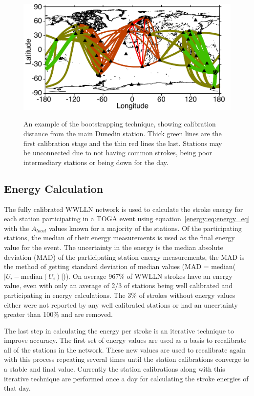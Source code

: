 \begin{figure}[ht!]
\centering
\includegraphics[scale=1]{energy/Figures/PPS_Hop.pdf}\\
\caption{An example of the bootstrapping technique, showing calibration distance from the main Dunedin station. Thick green lines are the first calibration stage and the thin red lines the last. Stations may be unconnected due to not having common strokes, being poor intermediary stations or being down for the day.}
\label{energy:fig:bootstrap}
\end{figure}

\subsection{Energy Calculation}

The fully calibrated WWLLN network is used to calculate the stroke energy for each station participating in a TOGA event using equation~\ref{energy:eq:energy_eq} with the $A_{local}$ values known for a majority of the stations.
Of the participating stations, the median of their energy measurements is used as the final energy value for the event.
The uncertainty in the energy is the median absolute deviation (MAD) of the participating station energy measurements, the MAD is the method of getting standard deviation of median values (MAD = median($|U_i - $median$(U_i)|$)).
On average 967\% of WWLLN strokes have an energy value, even with only an average of 2/3 of stations being well calibrated and participating in energy calculations.
The 3\% of strokes without energy values either were not reported by any well calibrated stations or had an uncertainty greater than 100\% and are removed.

The last step in calculating the energy per stroke is an iterative technique to improve accuracy.
The first set of energy values are used as a basis to recalibrate all of the stations in the network.
These new values are used to recalibrate again with this process repeating several times until the station calibrations converge to a stable and final value.
Currently the station calibrations along with this iterative technique are performed once a day for calculating the stroke energies of that day.

